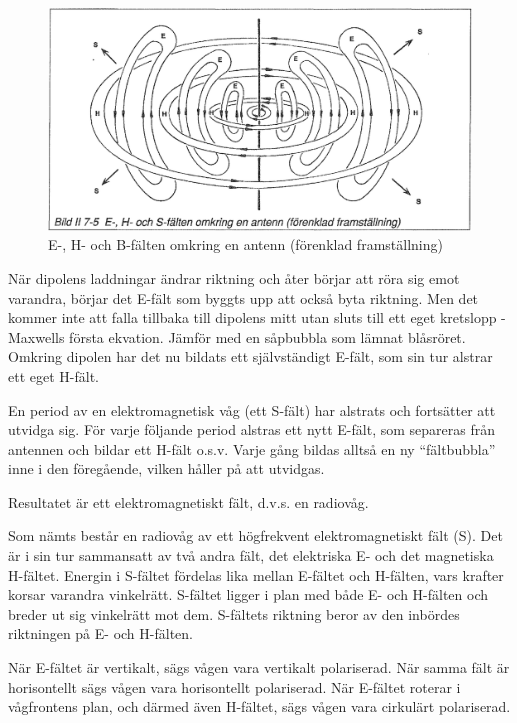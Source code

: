 \begin{figure}
\includegraphics[width=\textwidth]{images/bild_2_7-05}
\caption{E-, H- och B-fälten omkring en antenn (förenklad framställning)}
\label{fig:BildII7-05}
\end{figure}

När dipolens laddningar ändrar riktning och åter börjar att röra sig
emot varandra, börjar det E-fält som byggts upp att också byta
riktning. Men det kommer inte att falla tillbaka till dipolens mitt
utan sluts till ett eget kretslopp - Maxwells första ekvation. Jämför
med en såpbubbla som lämnat blåsröret.  Omkring dipolen har det nu
bildats ett självständigt E-fält, som sin tur alstrar ett eget H-fält.

En period av en elektromagnetisk våg (ett S-fält) har alstrats och
fortsätter att utvidga sig. För varje följande period alstras ett nytt E-fält,
som separeras från antennen och bildar ett H-fält o.s.v. Varje gång bildas alltså en ny ``fältbubbla'' inne i den föregående, vilken håller på att utvidgas.

Resultatet är ett elektromagnetiskt fält, d.v.s. en radiovåg.

Som nämts består en radiovåg av ett högfrekvent elektromagnetiskt fält
(S). Det är i sin tur sammansatt av två andra fält, det elektriska E-
och det magnetiska H-fältet.  Energin i S-fältet fördelas lika mellan
E-fältet och H-fälten, vars krafter korsar varandra
vinkelrätt. S-fältet ligger i plan med både E- och H-fälten och breder
ut sig vinkelrätt mot dem. S-fältets riktning beror av den inbördes
riktningen på E- och H-fälten.

När E-fältet är vertikalt, sägs vågen vara vertikalt polariserad. När
samma fält är horisontellt sägs vågen vara horisontellt
polariserad. När E-fältet roterar i vågfrontens plan, och därmed även
H-fältet, sägs vågen vara cirkulärt polariserad.

